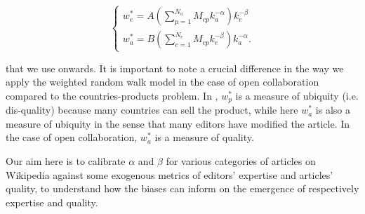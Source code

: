 \begin{equation}
\begin{cases}
 w^*_e = A(\sum^{N_a}_{p=1} M_{cp}k_a^{-\alpha})k_e^{-\beta} \\
w^*_a = B(\sum^{N_e}_{c=1} M_{cp}k_e^{-\beta})k_a^{-\alpha}.
\end{cases}
\end{equation}


that we use onwards. It is important to note a crucial difference in the way we apply the weighted random walk model in the case of open collaboration compared to the countries-products problem. In \cite{caldarelli2012network}, $w^*_p$ is a measure of ubiquity (i.e. dis-quality) because many countries can sell the product, while here $w^*_a$ is also a measure of ubiquity in the sense that many editors have modified the article. In the case of open collaboration, $w^*_a$ is a measure of quality.

Our aim here is to calibrate $\alpha$ and $\beta$ for various categories of articles on Wikipedia against some exogenous metrics of editors' expertise and articles' quality, to understand how the biases can inform on the emergence of respectively expertise and quality.
